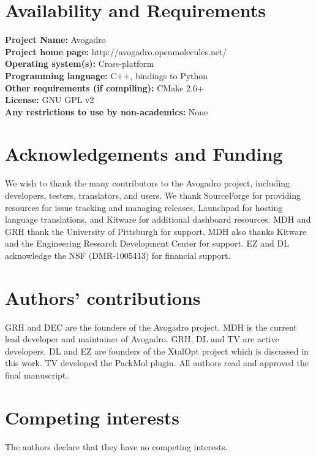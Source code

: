 \documentclass[10pt]{bmc_article}
\newenvironment{bmcformat}{\begin{raggedright}
\baselineskip20pt\sloppy\setboolean{publ}{false}}{\end{raggedright}
\baselineskip20pt\sloppy}
\begin{document}
\begin{bmcformat}



\section{Availability and Requirements}

\textbf{Project Name:} Avogadro \\
\textbf{Project home page:} http://avogadro.openmolecules.net/ \\
\textbf{Operating system(s):} Cross-platform \\
\textbf{Programming language:} C++, bindings to Python \\
\textbf{Other requirements (if compiling):} CMake 2.6+ \\
\textbf{License:} GNU GPL v2 \\
\textbf{Any restrictions to use by non-academics:} None

\section{Acknowledgements and Funding}

We wish to thank the many contributors to the Avogadro project, including
developers, testers, translators, and users. We thank SourceForge for
providing resources for issue tracking and managing releases,
Launchpad for hosting language translations, and
Kitware for additional dashboard resources. MDH and GRH thank the
University of Pittsburgh for support. MDH also thanks Kitware and the
Engineering Research Development Center for support. EZ and DL acknowledge
the NSF (DMR-1005413) for financial support.

\section{Authors' contributions}
GRH and DEC are the founders of the Avogadro project. MDH is the
current lead developer and maintainer of Avogadro. GRH, DL and TV are
active developers. DL and EZ are founders of the XtalOpt project which
is discussed in this work. TV developed the PackMol plugin. All
authors read and approved the final manuscript.

\section{Competing interests}

The authors declare that they have no competing interests.


\end{bmcformat}
\end{document}
